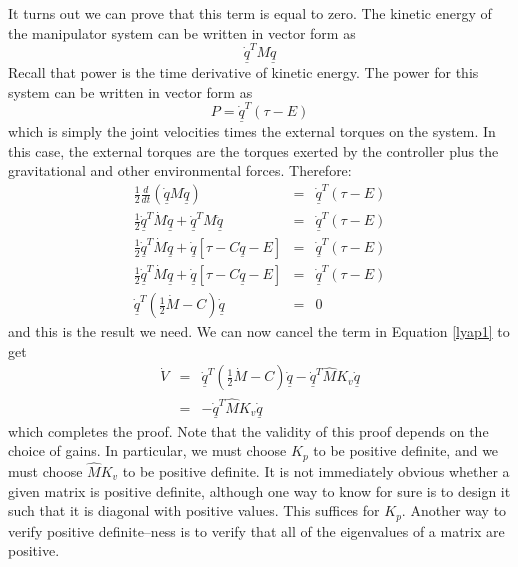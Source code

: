 \documentclass[]{article}
\begin{document}
It turns out we can prove that this term is equal to zero. The kinetic energy of the manipulator system can be written in vector form as
\begin{displaymath}
 \dot{\underline{q}}^{T}M\dot{\underline{q}}
\end{displaymath}
Recall that power is the time derivative of kinetic energy. The power for this system can be written in vector form as
\begin{displaymath}
 P = \dot{\underline{q}}^{T}\left(\tau-E\right)
\end{displaymath}
which is simply the joint velocities times the external torques on the system. In this case, the external torques are the torques exerted by the controller plus the gravitational and other environmental forces. Therefore:
\begin{eqnarray}
\frac{1}{2}\frac{d}{dt}\left(\dot{\underline{q}} M\dot{\underline{q}}\right) & = & \dot{\underline{q}}^{T}\left(\tau-E\right) \nonumber \\
\frac{1}{2}\dot{\underline{q}}^{T}\dot{M}\dot{\underline{q}} + \dot{\underline{q}}^{T}M\underline{\ddot{q}} & = & \dot{\underline{q}}^{T}\left(\tau-E\right) \nonumber \\
\frac{1}{2}\dot{\underline{q}}^{T}\dot{M}\dot{\underline{q}} + \dot{\underline{q}}\left[\tau - C\dot{\underline{q}} - E\right] & = & \dot{\underline{q}}^{T}\left(\tau-E\right) \nonumber \\
\frac{1}{2}\dot{\underline{q}}^{T}\dot{M}\dot{\underline{q}} + \dot{\underline{q}}\left[\tau - C\dot{\underline{q}} - E\right] & = & \dot{\underline{q}}^{T}\left(\tau-E\right) \nonumber \\
\dot{\underline{q}}^{T}\left(\frac{1}{2}\dot{M} - C\right)\dot{\underline{q}} & = & 0 \nonumber
\end{eqnarray}
and this is the result we need. We can now cancel the term in Equation \ref{lyap1}
to get
\begin{eqnarray}
\dot{V} & = & \dot{\underline{q}}^{T}\left( \frac{1}{2}\dot{M} - C\right)\dot{\underline{q}} - \dot{\underline{q}}^{T}\hat{M}K_{v}\dot{\underline{q}} \nonumber \\
& = & - \dot{\underline{q}}^{T}\hat{M}K_{v}\dot{\underline{q}} \nonumber
\end{eqnarray}
which completes the proof. Note that the validity of this proof depends on the choice of gains. In particular, we must choose $K_{p}$ to be positive definite, and we must choose $\hat{M}K_{v}$ to be positive definite. It is not immediately obvious whether a given matrix is positive definite, although one way to know for sure is to design it such that it is diagonal with positive values. This suffices for $K_{p}$. Another way to verify positive definite--ness is to verify that all of the eigenvalues of a matrix are positive.
\end{document}
